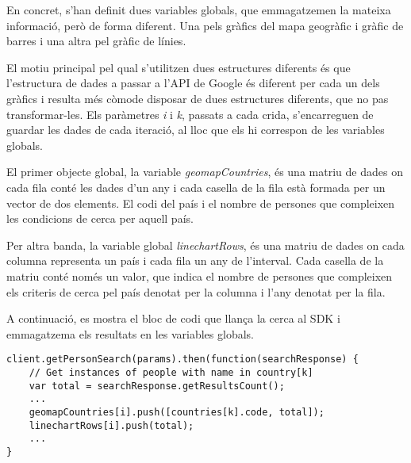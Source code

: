 En concret, s'han definit dues variables globals, que emmagatzemen la mateixa informació, però de forma diferent. Una pels gràfics del mapa geogràfic i gràfic de barres i una altra pel gràfic de línies.

El motiu principal pel qual s’utilitzen dues estructures diferents és que l'estructura de dades a passar a l’API de Google és diferent per cada un dels gràfics i resulta més còmode disposar de dues estructures diferents, que no pas transformar-les. Els paràmetres \emph{i} i \emph{k}, passats a cada crida, s’encarreguen de guardar les dades de cada iteració, al lloc que els hi correspon de les variables globals.

El primer objecte global, la variable \emph{geomapCountries}, és una matriu de dades on cada fila conté les dades d'un any i cada casella de la fila està formada per un vector de dos elements. El codi del país i el nombre de persones que compleixen les condicions de cerca per aquell país.

Per altra banda, la variable global \emph{linechartRows}, és una matriu de dades on cada columna representa un país i cada fila un any de l'interval. Cada casella de la matriu conté només un valor, que indica el nombre de persones que compleixen els criteris de cerca pel país denotat per la columna i l’any denotat per la fila.

A continuació, es mostra el bloc de codi que llança la cerca al SDK i  emmagatzema els resultats en les variables globals.

\begin{lstlisting}[style=rawOwn,caption={Crida al SDK i actualització de variables globals}]
client.getPersonSearch(params).then(function(searchResponse) {
    // Get instances of people with name in country[k]
    var total = searchResponse.getResultsCount();
    ...
    geomapCountries[i].push([countries[k].code, total]);
    linechartRows[i].push(total);
    ...
}
\end{lstlisting}
